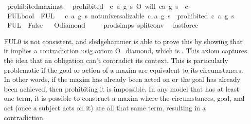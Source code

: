 \begin{isabellebody}
\isamarkupfalse%
\ prohibited{\isacharcolon}{\isacharcolon}{\isachardoublequoteopen}maxim{\isasymRightarrow}s{\isasymRightarrow}t{\isachardoublequoteclose}\ \ \isanewline
{\isachardoublequoteopen}prohibited\ {\isasymequiv}\ {\isasymlambda}{\isacharparenleft}c{\isacharcomma}\ a{\isacharcomma}\ g{\isacharparenright}\ s{\isachardot}\ O{\isacharbraceleft}\isactrlbold {\isasymnot}\ {\isacharparenleft}will\ {\isacharparenleft}c{\isacharcomma}a{\isacharcomma}\ g{\isacharparenright}\ s{\isacharparenright}\ {\isacharbar}\ c{\isacharbraceright}{\isachardoublequoteclose}\isanewline
\isanewline
{}\isamarkupfalse%
\ FUL{}{\isacharcolon}{\isacharcolon}bool\ \ {\isachardoublequoteopen}FUL{}\ {\isasymequiv}\ {\isasymforall}\ c\ a\ g\ s{\isachardot}\ not{\isacharunderscore}universalizable\ {\isacharparenleft}c{\isacharcomma}\ a{\isacharcomma}\ g{\isacharparenright}\ s\ {\isasymlongrightarrow}\ {\isasymTurnstile}{\isacharparenleft}{\isacharparenleft}prohibited\ {\isacharparenleft}c{\isacharcomma}\ a{\isacharcomma}\ g{\isacharparenright}\ s{\isacharparenright}{\isacharparenright}{\isachardoublequoteclose}\isanewline
%
\isanewline
\isanewline
{}\isamarkupfalse%
\ {\isachardoublequoteopen}FUL{}\ {\isasymlongrightarrow}\ False{\isachardoublequoteclose}%
\isadelimproof
\ %
\endisadelimproof
%
\isatagproof
{}\isamarkupfalse%
\ O{\isacharunderscore}diamond\ \isanewline
\ \ \isamarkupfalse%
\ prod{\isachardot}simps{\isacharparenleft}{}{\isacharparenright}\ split{\isacharunderscore}conv\ \isamarkupfalse%
\ fastforce%
\endisatagproof
{\isafoldproof}%
%
\isadelimproof
%
\endisadelimproof
%
\begin{isamarkuptext}%
FUL0 is not consistent, and sledgehammer is able to prove this by showing that it implies a contradiction 
usig axiom O\_diamond, which is . This axiom captures 
the idea that an obligation can't contradict its context. This is particularly problematic if the goal or 
action of a maxim are equivalent to its circumstances. In other words, if the maxim has already been 
acted on or the goal has already been achieved, then prohibiting it is impossible. 
In any model that has at least one term, it is possible to construct a maxim where the circumstances, goal, 
and act (once a subject acts on it) are all that same term, resulting in a contradiction. 


\end{isamarkuptext}
\end{isabellebody}

